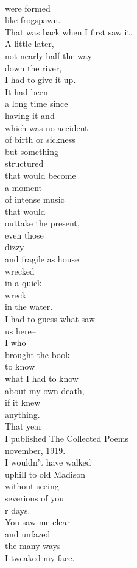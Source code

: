 \documentclass[smalldemyvopaper,11pt,twoside,onecolumn,openright,extrafontsizes]{memoir}
\begin{document}
\\were formed
\\like frogspawn.
\\That was back when I first saw it.
\\A little later,
\\not nearly half the way
\\down the river,
\\I had to give it up.
\\It had been
\\a long time since
\\having it and
\\which was no accident
\\of birth or sickness
\\but something
\\structured
\\that would become
\\a moment
\\of intense music
\\that would
\\outtake the present,
\\even those
\\dizzy
\\and fragile as house
\\wrecked
\\in a quick
\\wreck
\\in the water.
\\I had to guess what saw
\\us here--
\\I who
\\brought the book
\\to know
\\what I had to know
\\about my own death,
\\if it knew
\\anything.
\\That year
\\I published The Collected Poems
\\november, 1919.
\\I wouldn't have walked
\\uphill to old Madison
\\without seeing
\\severions of you
\\r days.
\\You saw me clear
\\and unfazed
\\the many ways
\\I tweaked my face.
\end{document}
